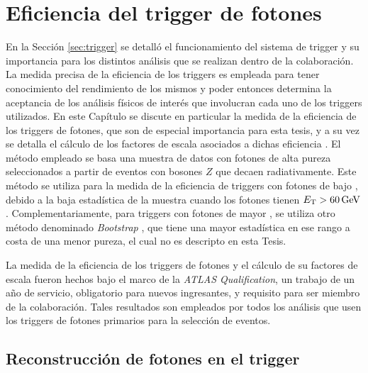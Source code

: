 \chapter{Eficiencia del trigger de fotones}


En la Sección \ref{sec:trigger} se detalló el funcionamiento del sistema de trigger y su importancia para los distintos análisis que se realizan dentro de la colaboración. La medida precisa de la eficiencia de los triggers es empleada para tener conocimiento del rendimiento de los mismos y poder entonces determina la aceptancia de los análisis físicos de interés que involucran cada uno de los triggers utilizados. 
En este Capítulo se discute en particular la medida de la eficiencia de los triggers de fotones, que son de especial importancia para esta tesis, y a su vez se detalla el cálculo de los factores de escala asociados a dichas eficiencia . El método empleado se basa una muestra de datos con fotones de alta pureza seleccionados a partir de eventos con bosones $Z$ que decaen radiativamente. Este método se utiliza para la medida de la eficiencia de triggers con fotones de bajo \ET, debido a la baja estadística de la muestra cuando los fotones tienen $E_{\text{T}}>60\,\text{GeV}$. Complementariamente, para triggers con fotones de mayor \ET, se utiliza otro método denominado \textit{Bootstrap} \cite{tesis_joaco}, que tiene una mayor estadística en ese rango a costa de una menor pureza, el cual no es descripto en esta Tesis.

La medida de la eficiencia de los triggers de fotones y el cálculo de su factores de escala fueron hechos bajo el marco de la \textit{ATLAS Qualification}, un trabajo de un año de servicio, obligatorio para nuevos ingresantes, y requisito para ser miembro de la colaboración. Tales resultados son empleados por todos los análisis que usen los triggers de fotones primarios para la selección de eventos.




\section{Reconstrucción de fotones en el trigger}

